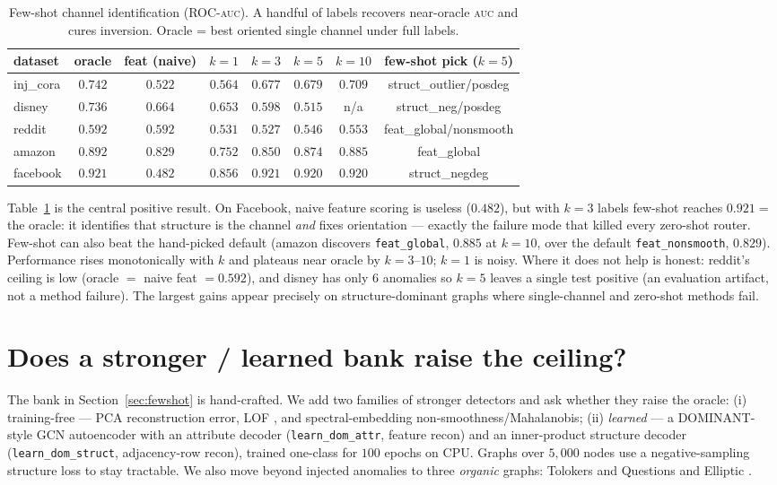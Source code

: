 \documentclass[11pt]{article}
\newcommand{\auc}{\textsc{auc}}
\begin{document}
\begin{table}[t]
\centering
\caption{Few-shot channel identification (ROC-\auc{}). A handful of labels recovers near-oracle
\auc{} and cures inversion. Oracle = best oriented single channel under full labels.}
\label{tab:fewshot}
\begin{tabular}{lccccccc}
\toprule
dataset & oracle & feat (naive) & $k{=}1$ & $k{=}3$ & $k{=}5$ & $k{=}10$ & few-shot pick ($k{=}5$) \\
\midrule
inj\_cora & $0.742$ & $0.522$ & $0.564$ & $0.677$ & $0.679$ & $0.709$ & struct\_outlier/posdeg \\
disney   & $0.736$ & $0.664$ & $0.653$ & $0.598$ & $0.515$ & n/a & struct\_neg/posdeg \\
reddit   & $0.592$ & $0.592$ & $0.531$ & $0.527$ & $0.546$ & $0.553$ & feat\_global/nonsmooth \\
amazon   & $0.892$ & $0.829$ & $0.752$ & $0.850$ & $0.874$ & $0.885$ & feat\_global \\
facebook & $0.921$ & $0.482$ & $0.856$ & $\mathbf{0.921}$ & $0.920$ & $0.920$ & struct\_negdeg \\
\bottomrule
\end{tabular}
\end{table}

Table~\ref{tab:fewshot} is the central positive result. On Facebook, naive feature scoring is
useless ($0.482$), but with $k{=}3$ labels few-shot reaches $0.921 =$ the oracle: it identifies
that structure is the channel \emph{and} fixes orientation --- exactly the failure mode that
killed every zero-shot router. Few-shot can also beat the hand-picked default (amazon discovers
\texttt{feat\_global}, $0.885$ at $k{=}10$, over the default \texttt{feat\_nonsmooth},
$0.829$). Performance rises monotonically with $k$ and plateaus near oracle by $k{=}3$--$10$;
$k{=}1$ is noisy. Where it does not help is honest: reddit's ceiling is low (oracle
$=$ naive feat $=0.592$), and disney has only $6$ anomalies so $k{=}5$ leaves a single test
positive (an evaluation artifact, not a method failure). The largest gains appear precisely on
structure-dominant graphs where single-channel and zero-shot methods fail.

\section{Does a stronger / learned bank raise the ceiling?}
\label{sec:bank}

The bank in Section~\ref{sec:fewshot} is hand-crafted. We add two families of stronger
detectors and ask whether they raise the oracle: (i) training-free --- PCA reconstruction error,
LOF \citep{breunig2000lof}, and spectral-embedding non-smoothness/Mahalanobis; (ii)
\emph{learned} --- a DOMINANT-style \citep{ding2019dominant} GCN autoencoder with an attribute
decoder (\texttt{learn\_dom\_attr}, feature recon) and an inner-product structure decoder
(\texttt{learn\_dom\_struct}, adjacency-row recon), trained one-class for $100$ epochs on CPU.
Graphs over $5{,}000$ nodes use a negative-sampling structure loss to stay tractable. We also
move beyond injected anomalies to three \emph{organic} graphs: Tolokers and Questions
\citep{platonov2023critical} and Elliptic \citep{weber2019elliptic}.
\end{document}
